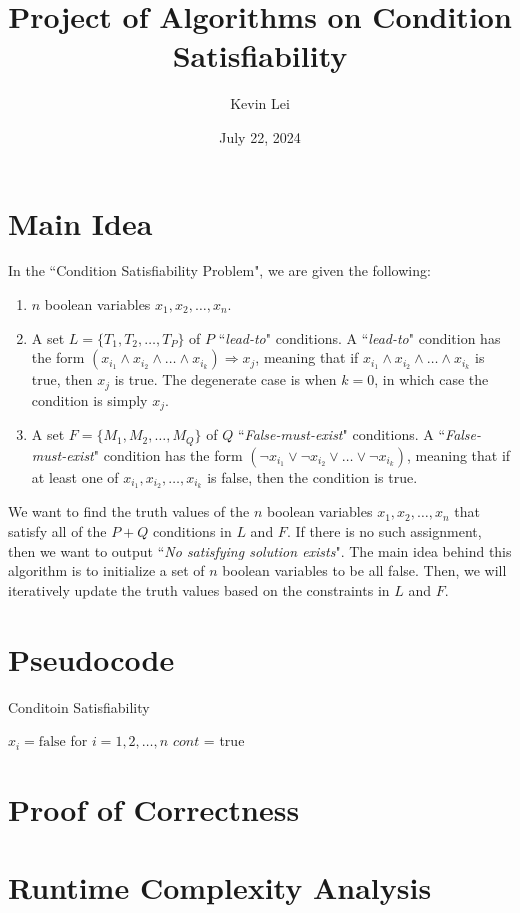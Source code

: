 \documentclass{article}
\title{Project of Algorithms on Condition Satisfiability}
\author{Kevin Lei}
\date{July 22, 2024}
\begin{document}
\maketitle

\section{Main Idea}

In the ``Condition Satisfiability Problem", we are given the following:
\begin{enumerate}
    \item $n$ boolean variables $x_1, x_2, \ldots, x_n$.
    \item A set $L = \{T_1, T_2, \ldots, T_P\}$ of $P$ ``\textit{lead-to}" conditions.
    A ``\textit{lead-to}" condition has the form $(x_{i_1} \land x_{i_2} \land \ldots \land x_{i_k}) \Rightarrow x_j$, 
    meaning that if $x_{i_1} \land x_{i_2} \land \ldots \land x_{i_k}$ is true, then $x_j$ is true.
    The degenerate case is when $k = 0$, in which case the condition is simply $x_j$.
    \item A set $F = \{M_1, M_2, \ldots, M_Q\}$ of $Q$ ``\textit{False-must-exist}" conditions.
    A ``\textit{False-must-exist}" condition has the form $(\neg x_{i_1} \lor \neg x_{i_2} \lor \ldots \lor \neg x_{i_k})$,
    meaning that if at least one of $x_{i_1}, x_{i_2}, \ldots, x_{i_k}$ is false, then the condition is true.
\end{enumerate}

We want to find the truth values of the $n$ boolean variables $x_1, x_2, \ldots, x_n$ that satisfy all of the $P + Q$ conditions in $L$ and $F$.
If there is no such assignment, then we want to output ``\textit{No satisfying solution exists}".
\vspace{1em}
\newline\noindent
The main idea behind this algorithm is to initialize a set of $n$ boolean variables to be all false.
Then, we will iteratively update the truth values based on the constraints in $L$ and $F$.

\section{Pseudocode}

\begin{algorithm}[H]
\caption{Conditoin Satisfiability}
$x_i = \text{false}$ for $i = 1, 2, \ldots, n$\;
$cont$ = true\;
\end{algorithm}

\section{Proof of Correctness}

\section{Runtime Complexity Analysis}
\end{document}
